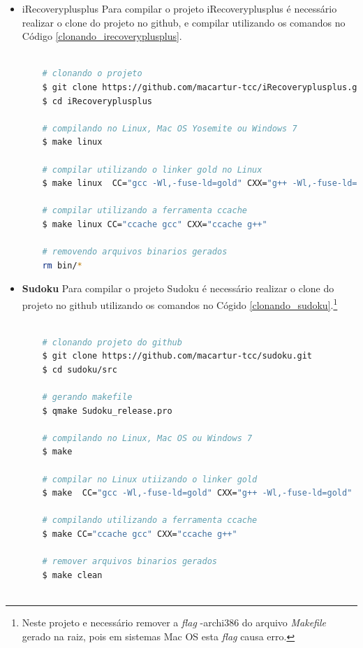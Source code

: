 \begin{itemize}
       \item {iRecoveryplusplus}
        \subitem Para compilar o projeto iRecoveryplusplus é necessário
 realizar o clone do projeto no github, e compilar utilizando os comandos no Código 
\ref{clonando_irecoveryplusplus}.


\begin{lstlisting}[language=bash, caption={Clonado e compilando o projeto iRecoveryplusplus},
                  label=clonando_irecoveryplusplus]

    # clonando o projeto
    $ git clone https://github.com/macartur-tcc/iRecoveryplusplus.git 
    $ cd iRecoveryplusplus

    # compilando no Linux, Mac OS Yosemite ou Windows 7
    $ make linux 
    
    # compilar utilizando o linker gold no Linux
    $ make linux  CC="gcc -Wl,-fuse-ld=gold" CXX="g++ -Wl,-fuse-ld=gold"

    # compilar utilizando a ferramenta ccache
    $ make linux CC="ccache gcc" CXX="ccache g++"

    # removendo arquivos binarios gerados
    rm bin/*
\end{lstlisting}

    \item \textbf{Sudoku}
    \subitem Para compilar o projeto Sudoku é necessário realizar o clone do projeto
no github utilizando os comandos no Cógido \ref{clonando_sudoku}.\footnote{Neste projeto e necessário remover a \textit{flag} -archi386 do arquivo \textit{Makefile} gerado na raiz, pois em sistemas Mac OS esta \textit{flag} causa erro.}

\begin{lstlisting}[language=bash, caption={Clonado e compilando o Projeto Sudoku},
                  label=clonando_sudoku]

    # clonando projeto do github 
    $ git clone https://github.com/macartur-tcc/sudoku.git 
    $ cd sudoku/src

    # gerando makefile
    $ qmake Sudoku_release.pro

    # compilando no Linux, Mac OS ou Windows 7
    $ make

    # compilar no Linux utiizando o linker gold
    $ make  CC="gcc -Wl,-fuse-ld=gold" CXX="g++ -Wl,-fuse-ld=gold"

    # compilando utilizando a ferramenta ccache
    $ make CC="ccache gcc" CXX="ccache g++"

    # remover arquivos binarios gerados
    $ make clean
    

\end{lstlisting}
\end{itemize}
